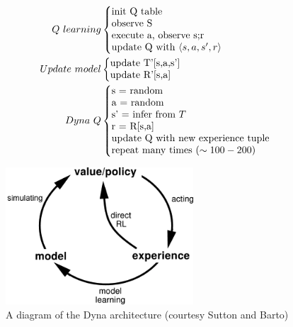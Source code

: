 \begin{align*}
\noindent Q\ learning&\left\{
	\begin{tabular}{@{}l@{}}
    	init Q table\\
        observe S\\
        execute a, observe s;r\\
        update Q with $\langle s, a, s', r \rangle$\\
    \end{tabular}
\right.\\
\noindent Update\ model&\left\{
	\begin{tabular}{@{}l@{}}
    	update T'[s,a,s']\\
        update R'[s,a]
    \end{tabular}
\right.\\
\noindent Dyna\ Q&\left\{
	\begin{tabular}{@{}l@{}}
    	s = random\\
        a = random\\
        s' = infer from $T$\\
        r = R[s,a]\\
        update Q with new experience tuple\\
        repeat many times ($\sim100-200$)
    \end{tabular}
\right.
\end{align*}

\begin{figure}[h]
	\centering
	\includegraphics[width=7cm]{images/Dyna-architecture.png}
	\caption{A diagram of the Dyna architecture (courtesy Sutton and Barto)}
\end{figure}